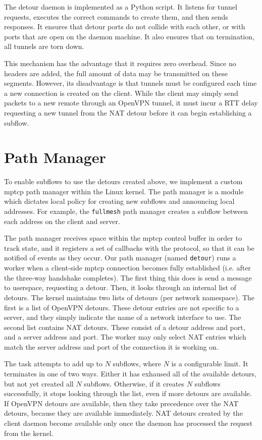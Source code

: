 \documentclass{cwru}
\begin{document}
The detour daemon is implemented as a Python script. It listens for tunnel
requests, executes the correct commands to create them, and then sends
responses. It ensures that detour ports do not collide with each other, or with
ports that are open on the daemon machine. It also ensures that on termination,
all tunnels are torn down.

This mechanism has the advantage that it requires zero overhead. Since no
headers are added, the full amount of data may be transmitted on these segments.
However, its disadvantage is that tunnels must be configured each time a new
connection is created on the client. While the client may simply send packets to
a new remote through an OpenVPN tunnel, it must incur a RTT delay requesting a
new tunnel from the NAT detour before it can begin establishing a subflow.

\section{Path Manager}

To enable subflows to use the detours created above, we implement a custom \ac{mptcp}
path manager within the Linux kernel. The path manager is a module which
dictates local policy for creating new subflows and announcing local addresses.
For example, the \texttt{fullmesh} path manager creates a subflow between each
address on the client and server.

The path manager receives space within the \ac{mptcp} control buffer in order to
track state, and it registers a set of callbacks with the protocol, so that it
can be notified of events as they occur. Our path manager (named
\texttt{detour}) runs a worker when a client-side \ac{mptcp} connection becomes
fully established (i.e. after the three-way handshake completes). The first
thing this does is send a message to userspace, requesting a detour. Then, it
looks through an internal list of detours. The kernel maintains two lists of
detours (per network namespace). The first is a list of OpenVPN detours. These
detour entries are not specific to a server, and they simply indicate the name
of a network interface to use. The second list contains NAT detours. These
consist of a detour address and port, and a server address and port. The worker
may only select NAT entries which match the server address and port of the
connection it is working on.

The task attempts to add up to $N$ subflows, where $N$ is a configurable limit.
It terminates in one of two ways. Either it has exhaused all of the available
detours, but not yet created all $N$ subflows. Otherwise, if it creates $N$
subflows successfully, it stops looking through the list, even if more detours
are available. If OpenVPN detours are available, then they take precedence over
the NAT detours, because they are available immediately. NAT detours created by
the client daemon become available only once the daemon has processed the
request from the kernel.
\end{document}
